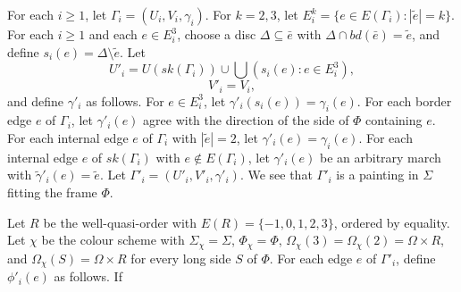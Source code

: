 For each $i\ge 1$, let $\Gamma_i=(U_i,V_i,\gamma_i)$. For $k=2,3$, let $E_i^k=\{e\in E(\Gamma_i):|\tilde{e}|=k\}$. For each $i\ge 1$ and each $e\in E_i^3$, choose a disc $\Delta\subseteq \bar{e}$ with $\Delta\cap bd(\bar{e})=\tilde{e}$, and define $s_i(e)=\Delta\setminus \tilde{e}$. Let
\begin{equation*}
U'_i = U(sk(\Gamma_i))\cup \bigcup (s_i(e):e\in E_i^3),
\end{equation*}
\begin{equation*}
V'_i = V_i,
\end{equation*}
and define $\gamma'_i$ as follows. For $e\in E_i^3$, let $\gamma'_i(s_i(e))=\gamma_i(e)$. For each border edge $e$ of $\Gamma_i$, let $\gamma'_i(e)$ agree with the direction of the side of $\Phi$ containing $e$. For each internal edge $e$ of $\Gamma_i$ with $|\tilde{e}|=2$, let $\gamma'_i(e)=\gamma_i(e)$. For each internal edge $e$ of $sk(\Gamma_i)$ with $e\notin E(\Gamma_i)$, let $\gamma'_i(e)$ be an arbitrary march with $\tilde{\gamma}'_i(e)=\tilde{e}$. Let $\Gamma'_i=(U'_i,V'_i,\gamma'_i)$. We see that $\Gamma'_i$ is a painting in $\Sigma$ fitting the frame $\Phi$.

Let $R$ be the well-quasi-order with $E(R)=\{-1,0,1,2,3\}$, ordered by equality. Let $\chi$ be the colour scheme with $\Sigma_\chi=\Sigma$, $\Phi_\chi=\Phi$, $\Omega_\chi(3)=\Omega_\chi(2)=\Omega\times R$, and $\Omega_\chi(S)=\Omega\times R$ for every long side $S$ of $\Phi$. For each edge $e$ of $\Gamma'_i$, define $\phi'_i(e)$ as follows. If
